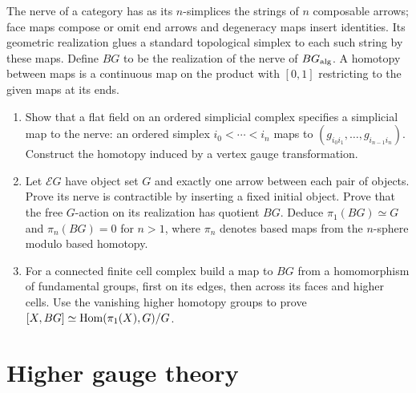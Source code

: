 \begin{exercise}
The nerve of a category has as its $n$-simplices the strings of
$n$ composable arrows; face maps compose or omit end arrows and
degeneracy maps insert identities. Its geometric realization
glues a standard topological simplex to each such string by these
maps. Define $BG$ to be the realization of the nerve of
$BG_{\rm alg}$.
A homotopy between maps is a continuous map on the product with
$[0,1]$ restricting to the given maps at its ends.
\begin{enumerate}[label=(\alph*)]
\item Show that a flat field on an ordered simplicial complex
specifies a simplicial map to the nerve: an ordered simplex
$i_0<\cdots<i_n$ maps to
$(g_{i_0i_1},\dots,g_{i_{n-1}i_n})$.
Construct the homotopy induced by a vertex gauge transformation.
\item Let $\mathcal E G$ have object set $G$ and exactly one
arrow between each pair of objects. Prove its nerve is
contractible by inserting a fixed initial object. Prove that
the free $G$-action on its realization has quotient $BG$.
Deduce $\pi_1(BG)\simeq G$ and $\pi_n(BG)=0$ for $n>1$,
where $\pi_n$ denotes based maps from the $n$-sphere modulo
based homotopy.
\item For a connected finite cell complex build a map to $BG$
from a homomorphism of fundamental groups, first on its edges,
then across its faces and higher cells. Use the vanishing
higher homotopy groups to prove
$[X,BG]\simeq\operatorname{Hom}(\pi_1(X),G)/G$.
\end{enumerate}
\end{exercise}

\section{Higher gauge theory}

